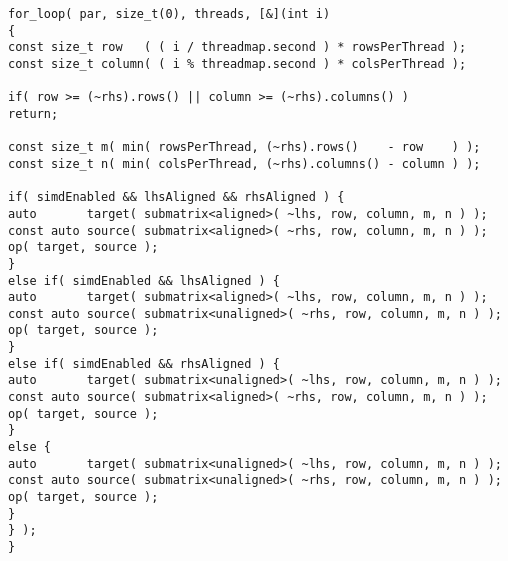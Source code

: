 \begin{lstlisting}[float,floatplacement=H,caption= {Previous implementation of Assign function for HPX backend in Blaze.}, label={old_hpx_backend}]
for_loop( par, size_t(0), threads, [&](int i)
{
const size_t row   ( ( i / threadmap.second ) * rowsPerThread );
const size_t column( ( i % threadmap.second ) * colsPerThread );

if( row >= (~rhs).rows() || column >= (~rhs).columns() )
return;

const size_t m( min( rowsPerThread, (~rhs).rows()    - row    ) );
const size_t n( min( colsPerThread, (~rhs).columns() - column ) );

if( simdEnabled && lhsAligned && rhsAligned ) {
auto       target( submatrix<aligned>( ~lhs, row, column, m, n ) );
const auto source( submatrix<aligned>( ~rhs, row, column, m, n ) );
op( target, source );
}
else if( simdEnabled && lhsAligned ) {
auto       target( submatrix<aligned>( ~lhs, row, column, m, n ) );
const auto source( submatrix<unaligned>( ~rhs, row, column, m, n ) );
op( target, source );
}
else if( simdEnabled && rhsAligned ) {
auto       target( submatrix<unaligned>( ~lhs, row, column, m, n ) );
const auto source( submatrix<aligned>( ~rhs, row, column, m, n ) );
op( target, source );
}
else {
auto       target( submatrix<unaligned>( ~lhs, row, column, m, n ) );
const auto source( submatrix<unaligned>( ~rhs, row, column, m, n ) );
op( target, source );
}
} );
}
\end{lstlisting}

